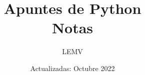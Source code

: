 \documentclass{article}
\title{Apuntes de Python\\
\Large{Notas}}
\author{LEMV}
\date{Actualizadas: Octubre 2022}
\begin{document}
\renewcommand*\contentsname{Índice}
\renewcommand{\listtablename}{Índice de Tablas}

\maketitle\newpage
\tableofcontents\newpage
\listoftables\newpage







\end{document}
